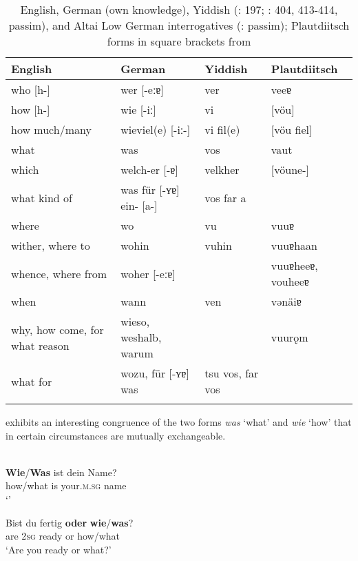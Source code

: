 \begin{table}
\caption{English, German (own knowledge), Yiddish (\citealt{Katz1987}: 197; \citealt{JacobsPrincevanderAuwera1994}: 404, 413-414, passim), and Altai Low German interrogatives (\citealt{Jedig2014}: passim); Plautdiitsch forms in square brackets from \citet{Nieuweboer1999}}
\label{tab:indo:5}

\begin{tabularx}{\textwidth}{Qlll}
\lsptoprule
\textbf{English} & \textbf{German} & \textbf{Yiddish} & \textbf{Plautdiitsch}\\
\midrule
who [h-] & wer [-eːɐ] & ver & veeɐ\\
how [h-] & wie [-iː] & vi & [vöu]\\
how much/many & wieviel(e) [-iː-] & vi fil(e) & [vöu fiel]\\
what & was & vos & vaut\\
which & welch-er [-ɐ] & velkher & [vöune-]\\
what kind of & was für [-ʏɐ] ein- [a-] & vos far a & \\
where & wo & vu & vuuɐ\\
wither, where to & wohin & vuhin & vuuɐhaan\\
whence, where from & woher [-eːɐ] &  & vuuɐheeɐ, vouheeɐ\\
when & wann & ven & vənäiɐ\\
why, how come, for what reason & wieso, weshalb, warum &  & vuurǫm\\
what for & wozu, für [-ʏɐ] was & tsu vos, far vos & \\
\lspbottomrule
\end{tabularx}
\end{table}

 exhibits an interesting congruence of the two forms \textit{was} ‘what’ and \textit{wie} ‘how’ that in certain circumstances are mutually exchangeable.

\ea%
    \label{ex:indo:41}
    \\
    \ea
    \gll \textbf{{Wie}}/\textbf{{Was}} ist   dein     Name?\\
    how/what  is  your.\textsc{m.sg}  name\\
    \glt ‘’
    
    \ex
    \gll Bist   du   fertig \textbf{{oder}} \textbf{{wie}}/\textbf{{was}}?\\
    are  2\textsc{sg}  ready  or  how/what\\
    \glt ‘Are you ready or what?’
    
